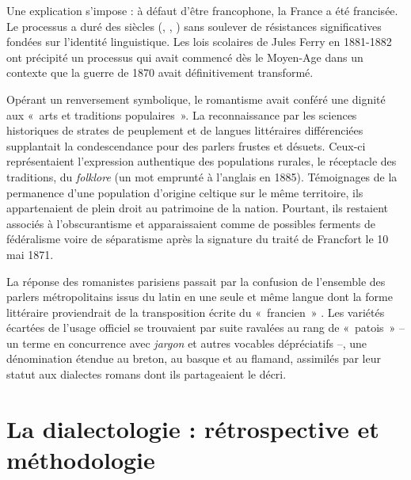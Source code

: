 \documentclass[output=paper]{langsci/langscibook}
\begin{document}
Une explication s’impose : à défaut d’être francophone, la France a été francisée. Le processus a duré des siècles (\citealt{brunot_histoire_1905}, \citealt{boyer_dix_2001}, \citealt{kremnitz_histoire_2013}) sans soulever de résistances significatives fondées sur l’identité linguistique. Les lois scolaires de Jules Ferry en 1881-1882 ont précipité un processus qui avait commencé dès le Moyen-Age dans un contexte que la guerre de 1870 avait définitivement transformé. 

Opérant un renversement symbolique, le romantisme avait conféré une dignité aux «~arts et traditions populaires~». La reconnaissance par les sciences historiques de strates de peuplement et de langues littéraires différenciées supplantait la condescendance pour des parlers frustes et désuets. Ceux-ci représentaient l’expression authentique des populations rurales, le réceptacle des traditions, du \textit{folklore} (un mot emprunté à l’anglais en 1885). Témoignages de la permanence d’une population d’origine celtique sur le même territoire, ils appartenaient de plein droit au patrimoine de la nation. Pourtant, ils restaient associés à l’obscurantisme et apparaissaient comme de possibles ferments de fédéralisme voire de séparatisme après la signature du traité de Francfort le 10 mai 1871. 

La réponse des romanistes parisiens passait par la confusion de l’ensemble des parlers métropolitains issus du latin en une seule et même langue dont la forme littéraire proviendrait de la transposition écrite du «~francien~» \citep{auroux_definition_1996}. Les variétés écartées de l’usage officiel se trouvaient par suite ravalées au rang de «~patois~» – un terme en concurrence avec \textit{jargon} et autres vocables dépréciatifs –, une dénomination étendue au breton, au basque et au flamand, assimilés par leur statut aux dialectes romans dont ils partageaient le décri.

\section{La dialectologie : rétrospective et méthodologie}
 
\end{document}
